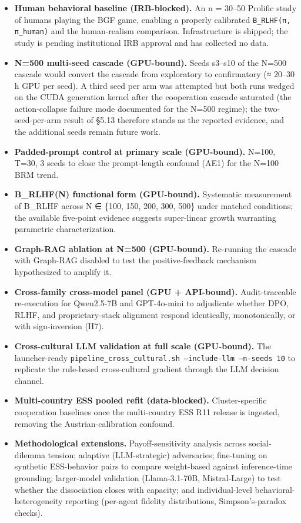 \begin{itemize}
\item \textbf{Human behavioral baseline (IRB-blocked).} An n = 30–50 Prolific study of humans playing the BGF game, enabling a properly calibrated \texttt{B\_RLHF(π, π\_human)} and the human-realism comparison. Infrastructure is shipped; the study is pending institutional IRB approval and has collected no data.
\item \textbf{N=500 multi-seed cascade (GPU-bound).} Seeds s3–s10 of the N=500 cascade would convert the cascade from exploratory to confirmatory (≈ 20–30 h GPU per seed). A third seed per arm was attempted but both runs wedged on the CUDA generation kernel after the cooperation cascade saturated (the action-collapse failure mode documented for the N=500 regime); the two-seed-per-arm result of §5.13 therefore stands as the reported evidence, and the additional seeds remain future work.
\item \textbf{Padded-prompt control at primary scale (GPU-bound).} N=100, T=30, 3 seeds to close the prompt-length confound (AE1) for the N=100 BRM trend.
\item \textbf{B\_RLHF(N) functional form (GPU-bound).} Systematic measurement of B\_RLHF across N ∈ \{100, 150, 200, 300, 500\} under matched conditions; the available five-point evidence suggests super-linear growth warranting parametric characterization.
\item \textbf{Graph-RAG ablation at N=500 (GPU-bound).} Re-running the cascade with Graph-RAG disabled to test the positive-feedback mechanism hypothesized to amplify it.
\item \textbf{Cross-family cross-model panel (GPU + API-bound).} Audit-traceable re-execution for Qwen2.5-7B and GPT-4o-mini to adjudicate whether DPO, RLHF, and proprietary-stack alignment respond identically, monotonically, or with sign-inversion (H7).
\item \textbf{Cross-cultural LLM validation at full scale (GPU-bound).} The launcher-ready \texttt{pipeline\_cross\_cultural.sh --include-llm --n-seeds 10} to replicate the rule-based cross-cultural gradient through the LLM decision channel.
\item \textbf{Multi-country ESS pooled refit (data-blocked).} Cluster-specific cooperation baselines once the multi-country ESS R11 release is ingested, removing the Austrian-calibration confound.
\item \textbf{Methodological extensions.} Payoff-sensitivity analysis across social-dilemma tension; adaptive (LLM-strategic) adversaries; fine-tuning on synthetic ESS-behavior pairs to compare weight-based against inference-time grounding; larger-model validation (Llama-3.1-70B, Mistral-Large) to test whether the dissociation closes with capacity; and individual-level behavioral-heterogeneity reporting (per-agent fidelity distributions, Simpson's-paradox checks).
\end{itemize}

